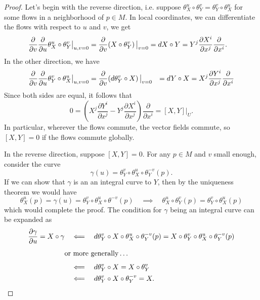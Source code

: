 \documentclass{lkx_paper}
\begin{document}
\begin{proof}
	Let's begin with the reverse direction, i.e. suppose $\theta^u_X \circ \theta^v_Y = \theta^v_Y \circ \theta^u_X$ for some flows in a neighborhood of $p\in M$. In local coordinates, we can
	differentiate the flows with respect to $u$ and $v$, we get
	\[
		\begin{aligned}
			\frac{\partial}{\partial v}\frac{\partial}{\partial u}\restr{\theta^u_X\circ \theta^v_Y}{u,v=0}
			 & = \frac{\partial}{\partial v} \restr{\left(X \circ \theta_Y^v\right)}{v=0} = dX\circ Y =
			Y^j  \frac{\partial X^i}{\partial x^j} \frac{\partial}{\partial x^i}.
		\end{aligned}
	\]
	In the other direction, we have
	\[
		\begin{aligned}
			\frac{\partial}{\partial v}\frac{\partial}{\partial u}\restr{\theta^v_Y\circ \theta^u_X}{u,v=0}
			 & = \frac{\partial}{\partial v}\restr{\left(d\theta_Y^v \circ X\right)}{v=0}
			 & = dY\circ X = X^j\frac{\partial Y^i}{\partial x^j}\frac{\partial}{\partial x^i}
		\end{aligned}
	\]
	Since both sides are equal, it follows that
	\[
		0 = \left(X^j\frac{\partial Y^i}{\partial x^j} - Y^j\frac{\partial X^i}{\partial x^j}\right)\frac{\partial}{\partial x^i}=[X,Y]|_U.
	\]
	In particular, wherever the flows commute, the vector fields commute, so $[X,Y]=0$ if the flows commute globally.

	In the reverse direction, suppose $[X,Y]=0$. For any $p\in M$ and $v$ small enough, consider the curve
	\[
		\gamma(u) = \theta_Y^v \circ \theta_X^u\circ \theta^{-v}_Y(p).
	\]
	If we can show that $\gamma$ is an an integral curve to $Y$, then by the uniqueness theorem we would have
	\[
		\theta^u_X(p) = \gamma(u) = \theta_Y^v\circ \theta^u_X\circ \theta^{-v}(p) \quad\implies\quad \theta^u_X\circ \theta^v_Y(p)= \theta^v_Y\circ \theta^u_X(p)
	\]
	which would complete the proof. The condition for $\gamma$ being an integral curve can be expanded as
	\[
		\begin{aligned}
			\frac{\partial \gamma}{\partial u} = X\circ \gamma
			 & \quad\Longleftarrow\quad d\theta^v_Y \circ X\circ \theta^u_X\circ \theta^{-v}_Y(p) = X\circ \theta^v_Y\circ \theta^u_X \circ \theta^{-v}_Y(p) \\
			 & \textrm{or more generally}\vphantom{\frac{1}{1}}\ldots                                                                                        \\
			 & \quad\Longleftarrow\quad d\theta^v_Y\circ X = X\circ \theta^v_Y                                                                               \\
			 & \quad\Longleftarrow\quad d\theta^v_Y\circ X\circ \theta^{-v}_Y = X.
		\end{aligned}
	\]


\end{proof}
\end{document}
